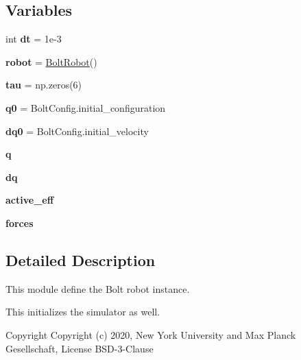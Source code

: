 \subsection*{Variables}
\begin{DoxyCompactItemize}
\item 
\mbox{\label{namespacerobot__properties__bolt_1_1bolt__wrapper_aa2de9a5941157d113ca35658c0ee0823}} 
int {\bfseries dt} = 1e-\/3
\item 
\mbox{\label{namespacerobot__properties__bolt_1_1bolt__wrapper_a8f3d7c90dbf4f1b9d1ab826df8bcc3bb}} 
{\bfseries robot} = \hyperlink{classrobot__properties__bolt_1_1bolt__wrapper_1_1BoltRobot}{Bolt\+Robot}()
\item 
\mbox{\label{namespacerobot__properties__bolt_1_1bolt__wrapper_aba6f9ab36d4d2a64b4a8486736547ef6}} 
{\bfseries tau} = np.\+zeros(6)
\item 
\mbox{\label{namespacerobot__properties__bolt_1_1bolt__wrapper_aede894a0ea7560d1776e4958981f1984}} 
{\bfseries q0} = Bolt\+Config.\+initial\+\_\+configuration
\item 
\mbox{\label{namespacerobot__properties__bolt_1_1bolt__wrapper_a052eb8a8fa362de3e368fa9bebcde2ee}} 
{\bfseries dq0} = Bolt\+Config.\+initial\+\_\+velocity
\item 
\mbox{\label{namespacerobot__properties__bolt_1_1bolt__wrapper_a87f42165a9b2fd12b37c361086a5eb31}} 
{\bfseries q}
\item 
\mbox{\label{namespacerobot__properties__bolt_1_1bolt__wrapper_ad19c9d5d9a64fc9896905489b06f6b8a}} 
{\bfseries dq}
\item 
\mbox{\label{namespacerobot__properties__bolt_1_1bolt__wrapper_a8148b016057d9391621554b0a12b903b}} 
{\bfseries active\+\_\+eff}
\item 
\mbox{\label{namespacerobot__properties__bolt_1_1bolt__wrapper_aa167d8288410b76c55aa98a08c740853}} 
{\bfseries forces}
\end{DoxyCompactItemize}


\subsection{Detailed Description}
This module define the Bolt robot instance. 

This initializes the simulator as well.

\begin{DoxyCopyright}{Copyright}
Copyright (c) 2020, New York University and Max Planck Gesellschaft, License B\+S\+D-\/3-\/\+Clause 
\end{DoxyCopyright}
